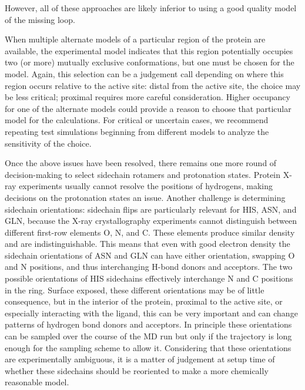 \documentclass[9pt,bestpractices,pubversion]{livecoms}
\begin{document}
However, all of these approaches are likely inferior to using a good quality model of the missing loop. 

When multiple alternate models of a particular region of the protein are available, the experimental model indicates that this region potentially occupies two (or more) mutually exclusive conformations, but one must be chosen for the model. Again, this selection can be a judgement call depending on where this region occurs relative to the active site: distal from the active site, the choice may be less critical; proximal requires more careful consideration. Higher occupancy for one of the alternate models could provide a reason to choose that particular model for the calculations. For critical or uncertain cases, we recommend repeating test simulations beginning from different models to analyze the sensitivity of the choice. 

Once the above issues have been resolved, there remains one more round of decision-making to select sidechain rotamers and protonation states. Protein X-ray experiments usually cannot resolve the positions of hydrogens, making decisions on the protonation states an issue. Another challenge is determining sidechain orientations: sidechain flips are particularly relevant for HIS, ASN, and GLN, because the X-ray crystallography experiments cannot distinguish between different first-row elements O, N, and C. These elements produce similar density and are indistinguishable. This means that even with good electron density the sidechain orientations of ASN and GLN can have either orientation, swapping O and N positions, and thus interchanging H-bond donors and acceptors. The two possible orientations of HIS sidechains effectively interchange N and C positions in the ring. Surface exposed, these different orientations may be of little consequence, but in the interior of the protein, proximal to the active site, or especially interacting with the ligand, this can be very important and can change patterns of hydrogen bond donors and acceptors. In principle these orientations can be sampled over the course of the MD run but only if the trajectory is long enough for the sampling scheme to allow it. Considering that these orientations are experimentally ambiguous, it is a matter of judgement at setup time of whether these sidechains should be reoriented to make a more chemically reasonable model. 
\end{document}
